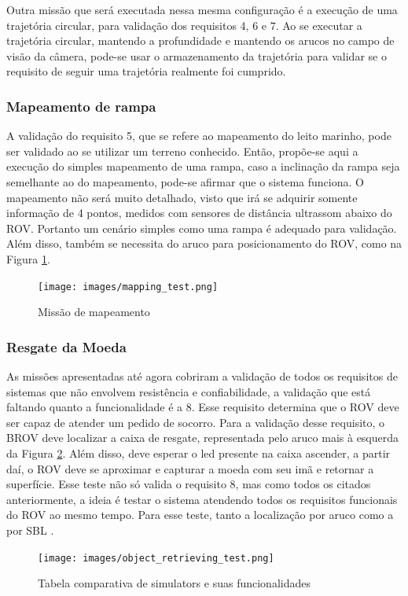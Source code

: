 Outra missão que será executada nessa mesma configuração é a execução de uma trajetória circular, para validação dos requisitos 4, 6 e 7. Ao se executar a trajetória circular, mantendo a profundidade e mantendo os arucos no campo de visão da câmera, pode-se usar o armazenamento da trajetória para validar se o requisito de seguir uma trajetória realmente foi cumprido.

\subsubsection*{Mapeamento de rampa}

A validação do requisito 5, que se refere ao mapeamento do leito marinho, pode ser
validado ao se utilizar um terreno conhecido. Então, propõe-se aqui a execução do simples mapeamento de uma rampa, caso a inclinação da rampa seja semelhante ao do mapeamento, pode-se afirmar que o sistema funciona. O mapeamento não será muito detalhado, visto que irá se adquirir somente informação de 4 pontos, medidos com sensores de distância ultrassom abaixo do ROV. Portanto um cenário simples como uma rampa é adequado para validação. Além disso, também se necessita do aruco para posicionamento do ROV, como na Figura \ref{fig:mapping-test}.

\begin{figure}[h]
	\label{fig:mapping-test}
	\caption{Missão de mapeamento}
	\centering
	\texttt{[image: images/mapping\_test.png]}
\end{figure}

\subsubsection*{Resgate da Moeda}
As missões apresentadas até agora cobriram a validação de todos os requisitos de sistemas que não envolvem resistência e confiabilidade, a validação que está faltando quanto a funcionalidade é a 8. Esse requisito determina que o ROV deve ser capaz de atender um pedido de socorro. Para a validação desse requisito, o BROV deve localizar a caixa de resgate, representada pelo aruco mais à esquerda da Figura \ref{fig:object-retrieving-test}. Além disso, deve esperar o led presente na caixa ascender, a partir daí, o ROV deve se aproximar e capturar a moeda com seu imã e retornar a superfície. Esse teste não só valida o requisito 8, mas como todos os citados anteriormente, a ideia é testar o sistema atendendo todos os requisitos funcionais do ROV ao mesmo tempo. Para esse teste, tanto a localização por aruco como a por SBL .

\begin{figure}[h]
	\label{fig:object-retrieving-test}
	\caption{Tabela comparativa de simulators e suas funcionalidades}
	\centering
	\texttt{[image: images/object\_retrieving\_test.png]}
\end{figure}


